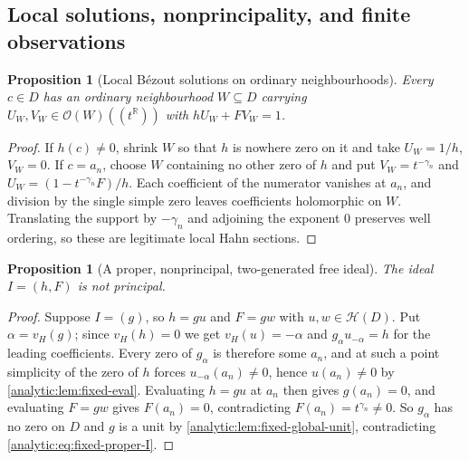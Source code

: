 \documentclass[11pt,letterpaper]{article}
\newtheorem{proposition}[theorem]{Proposition}
\theoremstyle{definition}
\theoremstyle{remark}
\newcommand{\R}{\mathbb R}
\newcommand{\HH}{\mathcal H}
\newcommand{\OO}{\mathcal O}
\newcommand{\vH}{v_{\!H}}
\numberwithin{equation}{section}
\begin{document}
\subsection{Local solutions, nonprincipality, and finite observations}
\begin{proposition}[Local B\'ezout solutions on ordinary neighbourhoods]
\label{analytic:prop:fixed-local-bezout}
Every $c\in D$ has an ordinary neighbourhood $W\subseteq D$ carrying
$U_W,V_W\in\OO(W)((t^\R))$ with $hU_W+FV_W=1$.
\end{proposition}
\begin{proof}
If $h(c)\ne0$, shrink $W$ so that $h$ is nowhere zero on it and take
$U_W=1/h$, $V_W=0$. If $c=a_n$, choose $W$ containing no other zero of $h$
and put $V_W=t^{-\gamma_n}$ and $U_W=(1-t^{-\gamma_n}F)/h$. Each
coefficient of the numerator vanishes at $a_n$, and division by the single
simple zero leaves coefficients holomorphic on $W$. Translating the support
by $-\gamma_n$ and adjoining the exponent $0$ preserves well ordering, so
these are legitimate local Hahn sections.
\end{proof}

\begin{proposition}[A proper, nonprincipal, two-generated free ideal]
\label{analytic:prop:fixed-nonprincipal}
The ideal $I=(h,F)$ is not principal.
\end{proposition}
\begin{proof}
Suppose $I=(g)$, so $h=gu$ and $F=gw$ with $u,w\in\HH(D)$. Put
$\alpha=\vH(g)$; since $\vH(h)=0$ we get $\vH(u)=-\alpha$ and
$g_\alpha u_{-\alpha}=h$ for the leading coefficients. Every zero of
$g_\alpha$ is therefore some $a_n$, and at such a point simplicity of the
zero of $h$ forces $u_{-\alpha}(a_n)\ne0$, hence $u(a_n)\ne0$ by
\cref{analytic:lem:fixed-eval}. Evaluating $h=gu$ at $a_n$ then gives
$g(a_n)=0$, and evaluating $F=gw$ gives $F(a_n)=0$, contradicting
$F(a_n)=t^{\gamma_n}\ne0$. So $g_\alpha$ has no zero on $D$ and $g$ is a
unit by \cref{analytic:lem:fixed-global-unit}, contradicting
\eqref{analytic:eq:fixed-proper-I}.
\end{proof}
\end{document}
